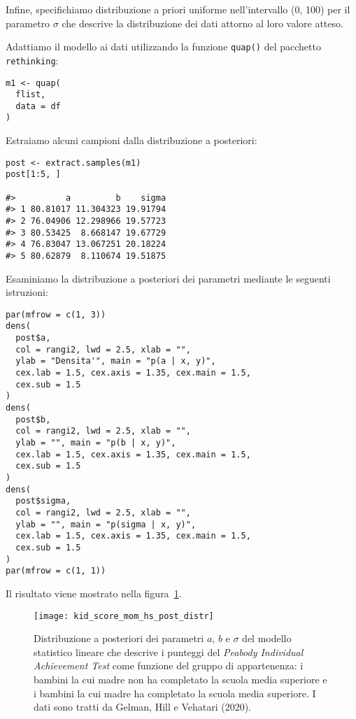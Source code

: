 Infine, specifichiamo distribuzione a priori uniforme nell'intervallo (0, 100) per il  parametro $\sigma$ che descrive la distribuzione dei dati attorno al loro valore atteso.

Adattiamo il modello ai dati utilizzando la funzione \verb+quap()+ del pacchetto \verb+rethinking+: 
\begin{lstlisting}
m1 <- quap(
  flist,
  data = df
)
\end{lstlisting}
 


\noindent
Estraiamo alcuni campioni dalla distribuzione a posteriori:




\begin{lstlisting}
post <- extract.samples(m1)
post[1:5, ]

#>          a         b    sigma
#> 1 80.81017 11.304323 19.91794
#> 2 76.04906 12.298966 19.57723
#> 3 80.53425  8.668147 19.67729
#> 4 76.83047 13.067251 20.18224
#> 5 80.62879  8.110674 19.51875
\end{lstlisting}
 


\noindent
Esaminiamo la distribuzione a posteriori dei parametri mediante le seguenti istruzioni:




\begin{lstlisting}
par(mfrow = c(1, 3))
dens(
  post$a,
  col = rangi2, lwd = 2.5, xlab = "",
  ylab = "Densita'", main = "p(a | x, y)",
  cex.lab = 1.5, cex.axis = 1.35, cex.main = 1.5,
  cex.sub = 1.5
)
dens(
  post$b,
  col = rangi2, lwd = 2.5, xlab = "",
  ylab = "", main = "p(b | x, y)",
  cex.lab = 1.5, cex.axis = 1.35, cex.main = 1.5,
  cex.sub = 1.5
)
dens(
  post$sigma,
  col = rangi2, lwd = 2.5, xlab = "",
  ylab = "", main = "p(sigma | x, y)",
  cex.lab = 1.5, cex.axis = 1.35, cex.main = 1.5,
  cex.sub = 1.5
)
par(mfrow = c(1, 1))
\end{lstlisting}
 


\noindent
Il risultato viene mostrato nella figura~\ref{fig:kid_score_mom_hs_post_distr}.

\begin{figure} %
 \centering
 \texttt{[image: kid\_score\_mom\_hs\_post\_distr]}
 \caption{Distribuzione a posteriori dei parametri $a$, $b$ e $\sigma$ del modello statistico lineare che descrive i punteggi del \emph{Peabody Individual Achievement Test} come funzione del gruppo di appartenenza: i bambini la cui madre non ha completato la scuola media superiore e i bambini la cui madre ha completato la scuola media superiore.
I dati sono tratti da Gelman, Hill e Vehatari (2020). 
}
\label{fig:kid_score_mom_hs_post_distr}
\end{figure}

